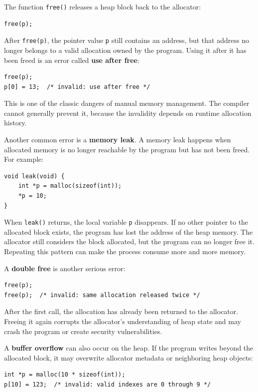 The function \texttt{free()} releases a heap block back to the allocator:

\begin{verbatim}
free(p);
\end{verbatim}

After \texttt{free(p)}, the pointer value \texttt{p} still contains an address, but that address no longer belongs to a valid allocation owned by the program. Using it after it has been freed is an error called \textbf{use after free}:

\begin{verbatim}
free(p);
p[0] = 13;  /* invalid: use after free */
\end{verbatim}

This is one of the classic dangers of manual memory management. The compiler cannot generally prevent it, because the invalidity depends on runtime allocation history.

Another common error is a \textbf{memory leak}. A memory leak happens when allocated memory is no longer reachable by the program but has not been freed. For example:

\begin{verbatim}
void leak(void) {
    int *p = malloc(sizeof(int));
    *p = 10;
}
\end{verbatim}

When \texttt{leak()} returns, the local variable \texttt{p} disappears. If no other pointer to the allocated block exists, the program has lost the address of the heap memory. The allocator still considers the block allocated, but the program can no longer free it. Repeating this pattern can make the process consume more and more memory.

A \textbf{double free} is another serious error:

\begin{verbatim}
free(p);
free(p);  /* invalid: same allocation released twice */
\end{verbatim}

After the first call, the allocation has already been returned to the allocator. Freeing it again corrupts the allocator's understanding of heap state and may crash the program or create security vulnerabilities.

A \textbf{buffer overflow} can also occur on the heap. If the program writes beyond the allocated block, it may overwrite allocator metadata or neighboring heap objects:

\begin{verbatim}
int *p = malloc(10 * sizeof(int));
p[10] = 123;  /* invalid: valid indexes are 0 through 9 */
\end{verbatim}

